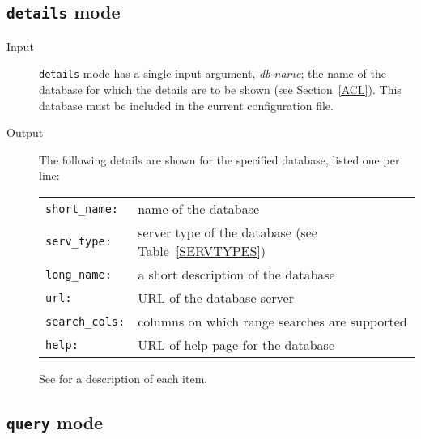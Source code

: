 \documentclass[twoside,11pt]{starlink}
\begin{document}
\subsection{\texttt{details} mode}

\begin{description}

  \item[Input] \texttt{details} mode has a single input argument, \textit{db-name}\/; the name of the database for which the details are to be
   shown (see Section~\ref{ACL}).  This database must be included in the
   current configuration file.

  \item[Output] The following details are shown for the specified
   database, listed one per line:

  \begin{tabular}{ll}
   \texttt{short\_name:}  & name of the database \\
   \texttt{serv\_type:}   & server type of the database (see
                         Table~\ref{SERVTYPES}) \\
   \texttt{long\_name:}   & a short description of the database \\
   \texttt{url:}          & URL of the database server \\
   \texttt{search\_cols:} & columns on which range searches are supported \\
   \texttt{help:}         & URL of help page for the database \\
  \end{tabular}

   See \cite{SSN75} for a description of each item.

\end{description}

\subsection{\texttt{query} mode}
\end{document}
